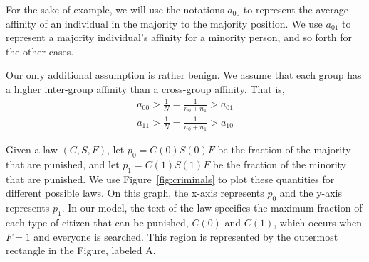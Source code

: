 
For the sake of example, we will use the notations $a_{00}$ to represent the average affinity of an individual in the majority to the majority position.  We use $a_{01}$ to represent a majority individual's affinity for a minority person, and so forth for the other cases.  

Our only additional assumption is rather benign.  We assume that each group has a higher inter-group affinity than a cross-group affinity.  That is, 
\begin{align}
a_{00} > \frac{1}{N}=\frac{1}{n_0+n_1} > a_{01} \\
a_{11} > \frac{1}{N}=\frac{1}{n_0+n_1}>  a_{10}
\end{align}

Given a law $(C, S, F)$, let $p_0 = C(0)S(0)F$ be the fraction of the majority that are punished, and let $p_1 = C(1)S(1)F$ be the fraction of the minority that are punished.  We use Figure~\ref{fig:criminals} to plot these quantities for different possible laws.  On this graph, the x-axis represents $p_0$ and the y-axis represents $p_1$.  In our model, the text of the law specifies the maximum fraction of each type of citizen that can be punished, $C(0)$ and $C(1)$, which occurs when $F=1$ and everyone is searched.  This region is represented by the outermost rectangle in the Figure, labeled A.



